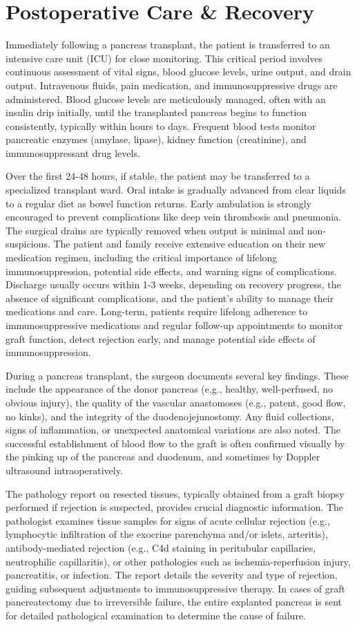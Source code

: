 \section*{Postoperative Care \& Recovery}
Immediately following a pancreas transplant, the patient is transferred to an intensive care unit (ICU) for close monitoring. This critical period involves continuous assessment of vital signs, blood glucose levels, urine output, and drain output. Intravenous fluids, pain medication, and immunosuppressive drugs are administered. Blood glucose levels are meticulously managed, often with an insulin drip initially, until the transplanted pancreas begins to function consistently, typically within hours to days. Frequent blood tests monitor pancreatic enzymes (amylase, lipase), kidney function (creatinine), and immunosuppressant drug levels.

Over the first 24-48 hours, if stable, the patient may be transferred to a specialized transplant ward. Oral intake is gradually advanced from clear liquids to a regular diet as bowel function returns. Early ambulation is strongly encouraged to prevent complications like deep vein thrombosis and pneumonia. The surgical drains are typically removed when output is minimal and non-suspicious. The patient and family receive extensive education on their new medication regimen, including the critical importance of lifelong immunosuppression, potential side effects, and warning signs of complications. Discharge usually occurs within 1-3 weeks, depending on recovery progress, the absence of significant complications, and the patient's ability to manage their medications and care. Long-term, patients require lifelong adherence to immunosuppressive medications and regular follow-up appointments to monitor graft function, detect rejection early, and manage potential side effects of immunosuppression.

During a pancreas transplant, the surgeon documents several key findings. These include the appearance of the donor pancreas (e.g., healthy, well-perfused, no obvious injury), the quality of the vascular anastomoses (e.g., patent, good flow, no kinks), and the integrity of the duodenojejunostomy. Any fluid collections, signs of inflammation, or unexpected anatomical variations are also noted. The successful establishment of blood flow to the graft is often confirmed visually by the pinking up of the pancreas and duodenum, and sometimes by Doppler ultrasound intraoperatively.

The pathology report on resected tissues, typically obtained from a graft biopsy performed if rejection is suspected, provides crucial diagnostic information. The pathologist examines tissue samples for signs of acute cellular rejection (e.g., lymphocytic infiltration of the exocrine parenchyma and/or islets, arteritis), antibody-mediated rejection (e.g., C4d staining in peritubular capillaries, neutrophilic capillaritis), or other pathologies such as ischemia-reperfusion injury, pancreatitis, or infection. The report details the severity and type of rejection, guiding subsequent adjustments to immunosuppressive therapy. In cases of graft pancreatectomy due to irreversible failure, the entire explanted pancreas is sent for detailed pathological examination to determine the cause of failure.

